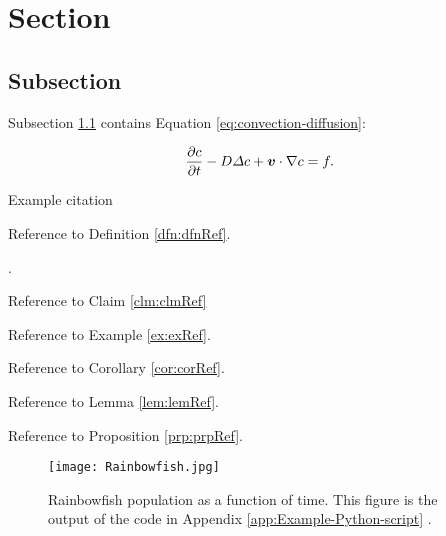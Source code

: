 \section{Section}\label{sse:Section}

\subsection{Subsection}\label{sss:Subsection}

Subsection \ref{sss:Subsection} contains Equation \eqref{eq:convection-diffusion}:

\begin{equation}\label{eq:convection-diffusion}
    \frac{\p c}{\p t} - D \Delta c + \mathbfit{v}\cdot\nabla c = f.
\end{equation}

Example citation \citep{baarslag2015learning}


Reference to Definition \ref{dfn:dfnRef}.


.


Reference to Claim \ref{clm:clmRef}


Reference to Example \ref{ex:exRef}.




Reference to Corollary \ref{cor:corRef}.


Reference to Lemma \ref{lem:lemRef}.


Reference to Proposition \ref{prp:prpRef}.

\begin{figure}[H]
    \centering
    \texttt{[image: Rainbowfish.jpg]}
    \caption[Rainbowfish population as a function of time]{Rainbowfish population as a function of time.
        This figure is the output of the code in Appendix \ref{app:Example-Python-script}  \citep{tudelftopencourseware}.}
    \label{fig:Rainbowfish}
\end{figure}